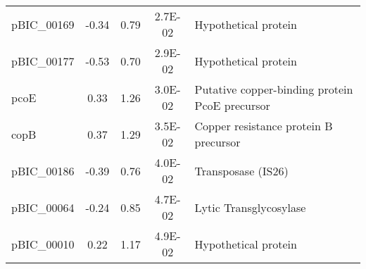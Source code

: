 \begin{table}[ht]
\begin{tabular}{lcccl}
    pBIC\_00169&	-0.34&	0.79&	2.7E-02	&Hypothetical protein\\
    pBIC\_00177&	-0.53&	0.70&	2.9E-02	&Hypothetical protein\\
    pcoE&	0.33&	1.26&	3.0E-02	&Putative copper-binding protein PcoE precursor\\
    copB&	0.37&	1.29&	3.5E-02	&Copper resistance protein B precursor\\
    pBIC\_00186& 	-0.39&	0.76&	4.0E-02&	Transposase (IS26)\\
    pBIC\_00064&	-0.24&	0.85&	4.7E-02	&Lytic Transglycosylase\\
    pBIC\_00010&	0.22&	1.17&	4.9E-02	&Hypothetical protein\\
   \hline
\end{tabular}
    \label{tabular:plasmid_diff_org}
\end{table}

